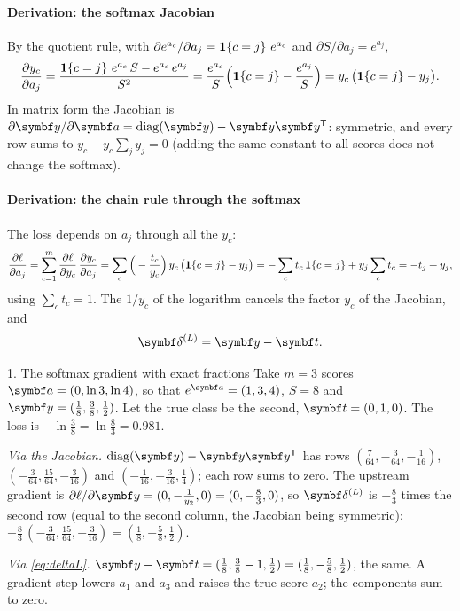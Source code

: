 \documentclass[11pt]{article}
\newcommand{\av}{\vect{a}}
\newcommand{\yv}{\vect{y}}
\newcommand{\tvec}{\vect{t}}
\newcommand{\dv}{\vect{\delta}}
\newcommand{\diag}{\operatorname{diag}}
\begin{document}
\paragraph{Derivation: the softmax Jacobian} By the quotient rule, with $\partial e^{a_c}/\partial a_j = \mathbf{1}\!\left\{c = j\right\}\,e^{a_c}$
and $\partial S/\partial a_j = e^{a_j}$,
\[
  \frac{\partial y_c}{\partial a_j} = \frac{\mathbf{1}\!\left\{c = j\right\}\,e^{a_c}\,S - e^{a_c}\,e^{a_j}}{S^2}
  = \frac{e^{a_c}}{S}\Big(\mathbf{1}\!\left\{c = j\right\} - \frac{e^{a_j}}{S}\Big) = y_c\,\big(\mathbf{1}\!\left\{c = j\right\} - y_j\big) .
\]
In matrix form the Jacobian is $\partial\yv/\partial\av = \diag(\yv) - \yv\yv\T$: symmetric, and every row sums to
$y_c - y_c\sum_j y_j = 0$ (adding the same constant to all scores does not change the softmax).

\paragraph{Derivation: the chain rule through the softmax} The loss depends on $a_j$ through all the $y_c$:
\[
  \frac{\partial \ell}{\partial a_j} = \sum_{c=1}^m \frac{\partial \ell}{\partial y_c}\,\frac{\partial y_c}{\partial a_j}
  = \sum_c \Big(-\frac{t_c}{y_c}\Big)\,y_c\,\big(\mathbf{1}\!\left\{c = j\right\} - y_j\big)
  = -\sum_c t_c\,\mathbf{1}\!\left\{c = j\right\} + y_j\sum_c t_c = -t_j + y_j ,
\]
using $\sum_c t_c = 1$. The $1/y_c$ of the logarithm cancels the factor $y_c$ of the Jacobian, and
\begin{equation}\label{eq:deltaL}
  \dv^{(L)} = \yv - \tvec .
\end{equation}

\begin{worked}{1. The softmax gradient with exact fractions}
Take $m = 3$ scores $\av = (0, \ln 3, \ln 4)$, so that $e^{\av} = (1, 3, 4)$, $S = 8$ and $\yv = (\frac18, \frac38,
\frac12)$. Let the true class be the second, $\tvec = (0, 1, 0)$. The loss is $-\ln\frac38 = \ln\frac83 = 0.981$.

\emph{Via the Jacobian.} $\diag(\yv) - \yv\yv\T$ has rows $(\frac{7}{64}, -\frac{3}{64}, -\frac{1}{16})$,
$(-\frac{3}{64}, \frac{15}{64}, -\frac{3}{16})$ and $(-\frac{1}{16}, -\frac{3}{16}, \frac14)$; each row sums to zero.
The upstream gradient is $\partial\ell/\partial\yv = (0, -\frac{1}{y_2}, 0) = (0, -\frac83, 0)$, so
$\dv^{(L)}$ is $-\frac83$ times the second row (equal to the second column, the Jacobian being symmetric): $-\frac83\,(-\frac{3}{64}, \frac{15}{64}, -\frac{3}{16}) =
(\frac18, -\frac58, \frac12)$.

\emph{Via \eqref{eq:deltaL}.} $\yv - \tvec = (\frac18, \frac38 - 1, \frac12) = (\frac18, -\frac58, \frac12)$, the same.
A gradient step lowers $a_1$ and $a_3$ and raises the true score $a_2$; the components sum to zero.
\end{worked}
\end{document}
